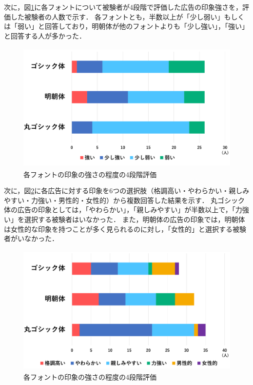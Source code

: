 \documentclass[12pt,a4j,titlepage]{ltjsarticle}
\begin{document}
次に，図\ref{fig:印象強さ}に各フォントについて被験者が4段階で評価した広告の印象強さを，評価した被験者の人数で示す．
各フォントとも，半数以上が「少し弱い」もしくは「弱い」と回答しており，明朝体が他のフォントよりも「少し強い」，「強い」と回答する人が多かった．

\begin{figure}[H]
\begin{center}
 \includegraphics[height=65mm]{figures/印象強さ.pdf}
\end{center}
 \caption{各フォントの印象の強さの程度の4段階評価}
 \label{fig:印象強さ}
\end{figure}

次に，図\ref{fig:広告の印象}に各広告に対する印象を6つの選択肢（格調高い・やわらかい・親しみやすい・力強い・男性的・女性的）から複数回答した結果を示す．
丸ゴシック体の広告の印象としては，「やわらかい」，「親しみやすい」が半数以上で，「力強い」を選択する被験者はいなかった．
また，明朝体の広告の印象では，明朝体は女性的な印象を持つことが多く見られるのに対し，「女性的」と選択する被験者がいなかった．

\begin{figure}[H]
\begin{center}
 \includegraphics[height=65mm]{figures/広告の印象.pdf}
\end{center}
 \caption{各フォントの印象の強さの程度の4段階評価}
 \label{fig:広告の印象}
\end{figure}
\end{document}

